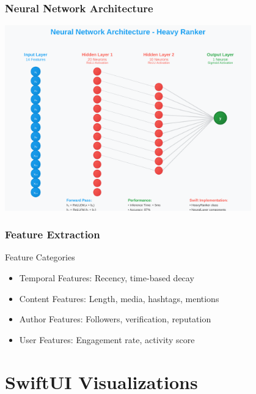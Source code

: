 \documentclass[aspectratio=169]{beamer}
\begin{document}
\begin{frame}
    \frametitle{Neural Network Architecture}
    \begin{center}
        \includegraphics[width=0.8\textwidth]{images/neural-network.svg}
    \end{center}
\end{frame}

\begin{frame}
    \frametitle{Feature Extraction}
    \begin{block}{Feature Categories}
        \begin{itemize}
            \item Temporal Features: Recency, time-based decay
            \item Content Features: Length, media, hashtags, mentions
            \item Author Features: Followers, verification, reputation
            \item User Features: Engagement rate, activity score
        \end{itemize}
    \end{block}
\end{frame}

\section{SwiftUI Visualizations}
\end{document}
